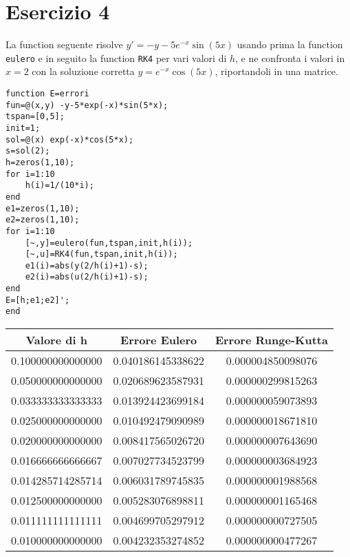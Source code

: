 \documentclass{article}
\begin{document}
\newpage

\section*{Esercizio 4}

La function seguente risolve $y'=-y-5e^{-x}\sin(5x)$ usando prima la function \texttt{eulero} e in seguito la function \texttt{RK4} per vari valori di $h$, e ne confronta i valori in $x=2$ con la soluzione corretta $y=e^{-x}\cos(5x)$, riportandoli in una matrice.
\begin{lstlisting}
function E=errori
fun=@(x,y) -y-5*exp(-x)*sin(5*x);
tspan=[0,5];
init=1;
sol=@(x) exp(-x)*cos(5*x);
s=sol(2);
h=zeros(1,10);
for i=1:10
    h(i)=1/(10*i);
end
e1=zeros(1,10);
e2=zeros(1,10);
for i=1:10
    [~,y]=eulero(fun,tspan,init,h(i));
    [~,u]=RK4(fun,tspan,init,h(i));
    e1(i)=abs(y(2/h(i)+1)-s);
    e2(i)=abs(u(2/h(i)+1)-s);
end
E=[h;e1;e2]';
end    
\end{lstlisting}

\par \bigskip
\begin{center}
\begin{tabular}{|c|c|c|}
\hline 
Valore di h & Errore Eulero & Errore Runge-Kutta \\ 
\hline 
0.100000000000000 &   0.040186145338622 &  0.000004850098076 \\
\hline
   0.050000000000000 & 0.020689623587931 &  0.000000299815263\\
\hline
   0.033333333333333 &  0.013924423699184 &  0.000000059073893\\
\hline
   0.025000000000000 & 0.010492479090989 &  0.000000018671810\\
\hline
   0.020000000000000 &  0.008417565026720 &  0.000000007643690\\
\hline
   0.016666666666667 &  0.007027734523799 &  0.000000003684923\\
\hline
   0.014285714285714 &  0.006031789745835 &  0.000000001988568\\
\hline
   0.012500000000000 &  0.005283076898811 &  0.000000001165468\\
\hline
   0.011111111111111 &  0.004699705297912 &  0.000000000727505\\
\hline
   0.010000000000000 &  0.004232353274852 &  0.000000000477267\\
\hline 
\end{tabular} 
\end{center}
\end{document}
